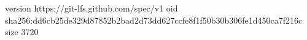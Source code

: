 version https://git-lfs.github.com/spec/v1
oid sha256:dd6cb25de329d87852b2bad2d73dd627ccfe8f1f50b30b306fe1d450ca7f216c
size 3720
